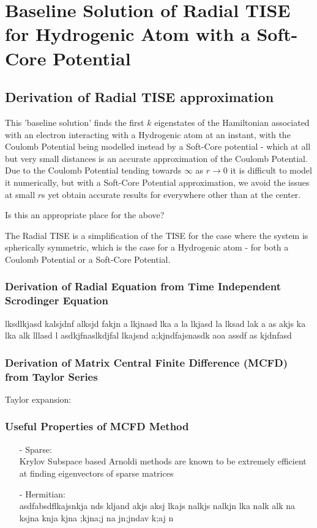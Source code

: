 
\chapter{Baseline Solution of Radial TISE for Hydrogenic Atom with a Soft-Core Potential} %

\label{Chapter2} %



\section{Derivation of Radial TISE approximation}
This 'baseline solution' finds the first $k$ eigenstates of the Hamiltonian associated with an electron interacting with a Hydrogenic atom at an instant, with the Coulomb Potential being modelled instead by a Soft-Core potential - which at all but very small distances is an accurate approximation of the Coulomb Potential. Due to the Coulomb Potential tending towards $\infty$ as $r\rightarrow 0$ it is difficult to model it numerically, but with a Soft-Core Potential approximation, we avoid the issues at small $r$s yet obtain accurate results for everywhere other than at the center.

Is this an appropriate place for the above?

The Radial TISE is a simplification of the TISE for the case where the system is spherically symmetric, which is the case for a Hydrogenic atom - for both a Coulomb Potential or a Soft-Core Potential.

\subsection{Derivation of Radial Equation from Time Independent Scrodinger Equation}
lksdlkjasd kalsjdnf alksjd fakjn a lkjnasd lka a la lkjasd la lksad lak a
as akjs ka lka alk lllasd l
asdkjfnaslkdjfal lkajsnd a;kjndfajsnasdk aoa 
assdf as kjdnfasd

\subsection{Derivation of Matrix Central Finite Difference (MCFD) from Taylor Series}
Taylor expansion: 


\subsection{Useful Properties of MCFD Method}
\begin{itemize}
\item[-]Sparse: \\ Krylov Subspace based Arnoldi methods are known to be extremely efficient at finding eigenvectors of sparse matrices
\item[-]Hermitian: \\ asdfabsdflkajsnkja nds kljand akjs aksj lkajs nalkjs nalkjn  lka nalk  alk na ksjna knja kjna ;kjna;j na jn;jndav k;aj n
\end{itemize}

